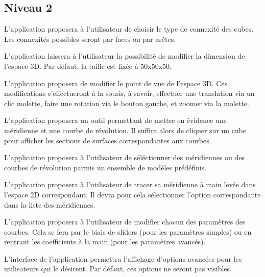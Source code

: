 \documentclass{scrartcl}
\begin{document}
	\subsection{Niveau 2}
		\begin{itemize}
				L'application proposera à l'utilisateur de choisir le type de connexité des cubes. Les connexités possibles seront par faces ou par arêtes.
		
				L'application laissera à l'utilisateur la possibilité de modifier la dimension de l'espace 3D. Par défaut, la taille est fixée à 50x50x50.
	
				L'application proposera de modifier le point de vue de l'espace 3D. Ces modifications s'effectueront à la souris, à savoir, effectuer une translation via un clic molette, faire une rotation via le bouton gauche, et zoomer via la molette.
		
				L'application proposera un outil permettant de mettre en évidence une méridienne et une courbe de révolution. Il suffira alors de cliquer sur un cube pour afficher les sections de surfaces correspondantes aux courbes. 
		
				L'application proposera à l'utilisateur de séléctionner des méridiennes ou des courbes de révolution parmis un ensemble de modèles prédéfinis.
				 
				L'application proposera à l'utilisateur de tracer sa méridienne à main levée dans l'espace 2D correspondant. Il devra pour cela sélectionner l'option correspondante dans la liste des méridiennes.
	
				L'application proposera à l'utilisateur de modifier chacun des paramètres des courbes. Cela se fera par le biais de sliders (pour les paramètres simples) ou en rentrant les coefficients à la main (pour les paramètres avancés).
		
				L'interface de l'application permettra l'affichage d'options avancées pour les utilisateurs qui le désirent. Par défaut, ces options ne seront pas visibles.
		\end{itemize}
\end{document}
